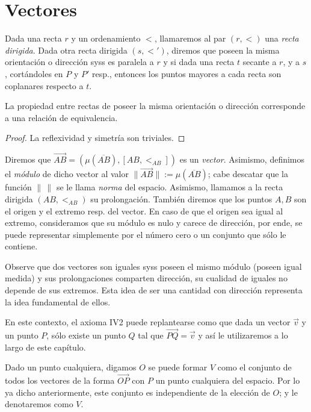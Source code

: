 \documentclass[11pt,a4paper]{book}
\begin{document}
\section{Vectores}
\begin{mydef}
	Dada una recta $r$ y un ordenamiento $<$, llamaremos al par $(r,<)$ una \textit{recta dirigida}. Dada otra recta dirigida $(s,<')$, diremos que poseen la misma orientación o dirección syss es paralela a $r$ y si dada una recta $t$ secante a $r$, y a $s$, cortándoles en $P$ y $P'$ resp., entonces los puntos mayores a cada recta son coplanares respecto a $t$.
\end{mydef}
\begin{lem}
La propiedad entre rectas de poseer la misma orientación o dirección corresponde a una relación de equivalencia.
\end{lem}
\begin{proof}
La reflexividad y simetría son triviales. 
\end{proof}
\begin{mydef}[Vectores]
	Diremos que $\overrightarrow{AB}=(\mu(\overline{AB}), [AB,<_{AB}])$ es un \textit{vector}. Asimismo, definimos el \textit{módulo} de dicho vector al valor $\|\overrightarrow{AB}\|:=\mu(\overline{AB})$; cabe descatar que la función $\|\,\|$ se le llama \textit{norma} del espacio. Asimismo, llamamos a la recta dirigida $(AB,<_{AB})$ su prolongación. También diremos que los puntos $A,B$ son el origen y el extremo resp. del vector. En caso de que el origen sea igual al extremo, consideramos que su módulo es nulo y carece de dirección, por ende, se puede representar simplemente por el número cero o un conjunto que sólo le contiene.

	Observe que dos vectores son iguales syss poseen el mismo módulo (poseen igual medida) y sus prolongaciones comparten dirección, su cualidad de iguales no depende de sus extremos. Esta idea de ser una cantidad con dirección representa la idea fundamental de ellos.
\end{mydef}
En este contexto, el axioma IV2 puede replantearse como que dada un vector $\vec{v}$ y un punto $P$, sólo existe un punto $Q$ tal que $\overrightarrow{PQ}=\vec{v}$ y así le utilizaremos a lo largo de este capítulo.

Dado un punto cualquiera, digamos $O$ se puede formar $V$ como el conjunto de todos los vectores de la forma $\overrightarrow{OP}$ con $P$ un punto cualquiera del espacio. Por lo ya dicho anteriormente, este conjunto es independiente de la elección de $O$; y le denotaremos como $V$.
\end{document}
